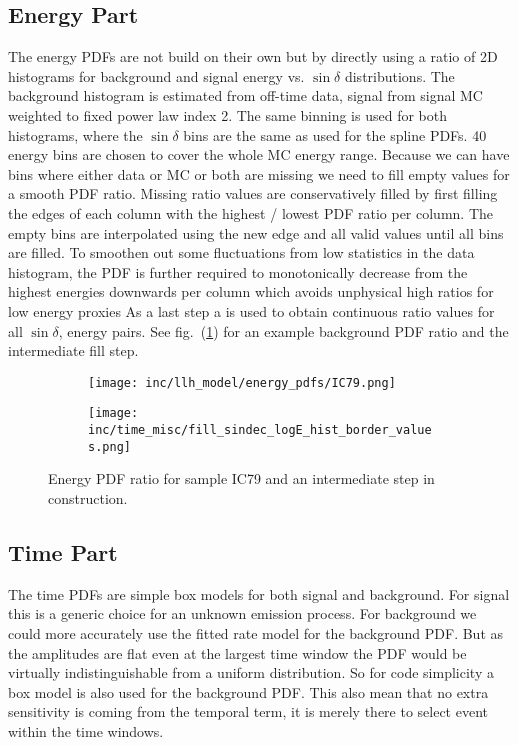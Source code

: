 \subsection{Energy Part}
The energy PDFs are not build on their own but by directly using a ratio of 2D histograms for background and signal energy vs. $\sin\delta$ distributions.
The background histogram is estimated from off-time data, signal from signal MC weighted to fixed power law index 2.
The same binning is used for both histograms, where the $\sin\delta$ bins are the same as used for the spline PDFs.
40 energy bins are chosen to cover the whole MC energy range.
Because we can have bins where either data or MC or both are missing we need to fill empty values for a smooth PDF ratio.
Missing ratio values are conservatively filled by first filling the edges of each column with the highest / lowest PDF ratio per column.
The empty bins are interpolated using the new edge and all valid values until all bins are filled.
To smoothen out some fluctuations from low statistics in the data histogram, the PDF is further required to monotonically decrease from the highest energies downwards per column which avoids unphysical high ratios for low energy proxies
As a last step a  is used to obtain continuous ratio values for all $\sin\delta$, energy pairs.
See fig.~(\ref{fig:energy_pdf_ratios}) for an example background PDF ratio and the intermediate fill step.

\begin{figure}[htbp]
  \centering
  \begin{subfigure}[c]{0.49\textwidth}
    \texttt{[image: inc/llh\_model/energy\_pdfs/IC79.png]}
  \end{subfigure}
  \hfill
  \begin{subfigure}[c]{0.49\textwidth}
    \texttt{[image: inc/time\_misc/fill\_sindec\_logE\_hist\_border\_values.png]}
  \end{subfigure}
  \caption{Energy PDF ratio for sample IC79 and an intermediate step in construction.}
  \label{fig:energy_pdf_ratios}
\end{figure}


\subsection{Time Part}
The time PDFs are simple box models for both signal and background.
For signal this is a generic choice for an unknown emission process.
For background we could more accurately use the fitted rate model for the background PDF.
But as the amplitudes are flat even at the largest time window the PDF would be virtually indistinguishable from a uniform distribution.
So for code simplicity a box model is also used for the background PDF.
This also mean that no extra sensitivity is coming from the temporal term, it is merely there to select event within the time windows.

